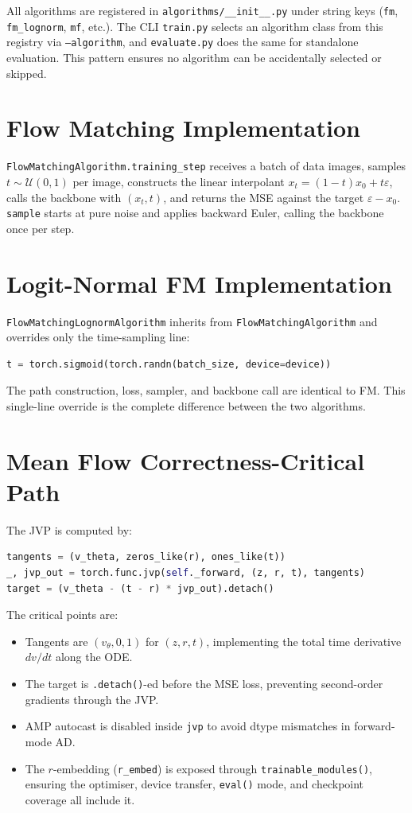 All algorithms are registered in \texttt{algorithms/\_\_init\_\_.py} under string
keys (\texttt{fm}, \texttt{fm\_lognorm}, \texttt{mf}, etc.). The CLI
\texttt{train.py} selects an algorithm class from this registry via
\texttt{--algorithm}, and \texttt{evaluate.py} does the same for standalone
evaluation. This pattern ensures no algorithm can be accidentally selected or
skipped.

\section{Flow Matching Implementation}

\texttt{FlowMatchingAlgorithm.training\_step} receives a batch of data images,
samples $t \sim \mathcal{U}(0, 1)$ per image, constructs the linear interpolant
$x_t = (1-t)x_0 + t\varepsilon$, calls the backbone with $(x_t, t)$, and
returns the MSE against the target $\varepsilon - x_0$. \texttt{sample} starts
at pure noise and applies backward Euler, calling the backbone once per step.

\section{Logit-Normal FM Implementation}

\texttt{FlowMatchingLognormAlgorithm} inherits from
\texttt{FlowMatchingAlgorithm} and overrides only the time-sampling line:
\begin{lstlisting}[language=Python]
t = torch.sigmoid(torch.randn(batch_size, device=device))
\end{lstlisting}
The path construction, loss, sampler, and backbone call are identical to FM.
This single-line override is the complete difference between the two algorithms.

\section{Mean Flow Correctness-Critical Path}

The JVP is computed by:
\begin{lstlisting}[language=Python]
tangents = (v_theta, zeros_like(r), ones_like(t))
_, jvp_out = torch.func.jvp(self._forward, (z, r, t), tangents)
target = (v_theta - (t - r) * jvp_out).detach()
\end{lstlisting}
The critical points are:
\begin{itemize}
  \item Tangents are $(v_\theta, 0, 1)$ for $(z, r, t)$, implementing the
        total time derivative $dv/dt$ along the ODE.
  \item The target is \texttt{.detach()}-ed before the MSE loss, preventing
        second-order gradients through the JVP.
  \item AMP autocast is disabled inside \texttt{jvp} to avoid dtype mismatches
        in forward-mode AD.
  \item The $r$-embedding (\texttt{r\_embed}) is exposed through
        \texttt{trainable\_modules()}, ensuring the optimiser, device transfer,
        \texttt{eval()} mode, and checkpoint coverage all include it.
\end{itemize}

